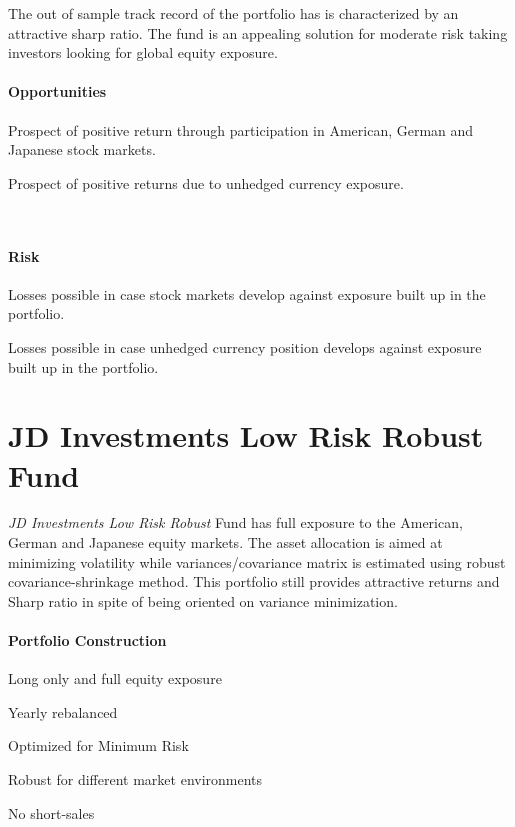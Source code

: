 \documentclass[11pt, DIV=15]{scrreprt}
\begin{document}
The out of sample track record of the portfolio has is characterized by an attractive sharp ratio.
The fund is an appealing solution for moderate risk taking investors looking for global equity exposure.

\begin{minipage}[t]{0.49\textwidth}
  \paragraph{Opportunities}
  \begin{sit}
    \item Prospect of positive return through participation in American, German and Japanese stock markets.
    \item Prospect of positive returns due to unhedged currency exposure.
  \end{sit}
\end{minipage}
~~
\begin{minipage}[t]{0.49\textwidth}
  \paragraph{Risk}
  \begin{sit}
    \item Losses possible in case stock markets develop against exposure built up in the portfolio.
    \item Losses possible in case unhedged currency position develops against exposure built up in the portfolio.    
  \end{sit}
\end{minipage}

\newpage\section*{JD Investments Low Risk Robust Fund}

\textit{JD Investments Low Risk Robust} Fund has full exposure to the American, German and Japanese equity markets.
The asset allocation is aimed at minimizing volatility while variances/covariance matrix is estimated using robust covariance-shrinkage method.
This portfolio still provides attractive returns and Sharp ratio in spite of being oriented on variance minimization.

\paragraph{Portfolio Construction}
\begin{sit}
\item Long only and full equity exposure
\item Yearly rebalanced
\item Optimized for Minimum Risk
\item Robust for different market environments
\item No short-sales
\end{sit}
\end{document}
